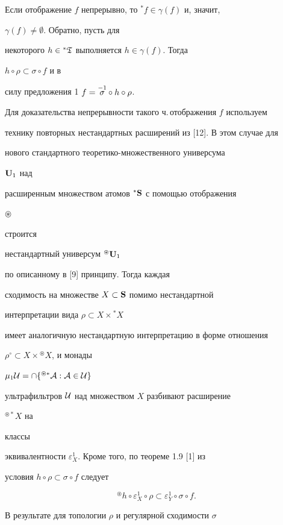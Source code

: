 \begin{pf}


Если отображение $f$ непрерывно, то ${}^*f\in\gamma(f)$ и, значит,


$\gamma(f)\ne\emptyset$. Обратно, пусть для


некоторого $h\in{}^*\frak T$ выполняется $h\in\gamma(f)$. Тогда


$h\circ \rho\subset\sigma\circ f$ и в


силу предложения 1\; $f=\overset{-1}{\sigma}{} \circ h\circ \rho$.


Для доказательства непрерывности такого ч.\,отображения $f$ используем


технику повторных нестандартных расширений из [12]. В этом случае для


нового стандартного теоретико-множественного универсума


$\bold U_1$ над


расширенным множеством атомов ${}^*\bold S$ с помощью отображения


$\circledast$


строится


нестандартный универсум ${}^\circledast\bold U_1$


по описанному в [9] принципу. Тогда каждая


сходимость на множестве $X\subset\bold S$ помимо нестандартной


интерпретации вида $\rho\subset X\times{}^*X$


имеет аналогичную нестандартную интерпретацию в форме отношения


$\rho^\circ\subset X\times{}^\circledast X$, и монады


$\mu_1\cal U=\cap\{{}^{\circledast *}A:A\in\cal U\}$


ультрафильтров $\cal U$ над множеством $X$ разбивают расширение


${}^{\circledast *}X$ на


классы


эквивалентности $\varepsilon^1_X$. Кроме того, по теореме 1.9 [1] из


условия $h\circ \rho\subset\sigma\circ f$ следует


$$


{}^\circledast h\circ \varepsilon^1_X\circ \rho\subset


\varepsilon^1_Y\circ \sigma\circ f.


$$


В результате для топологии $\rho$ и регулярной сходимости $\sigma$



\end{pf}
